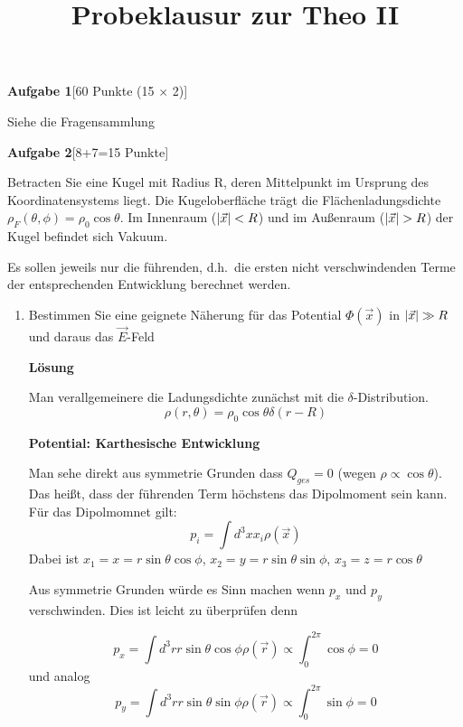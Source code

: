 
\title{Probeklausur zur Theo II}

\textbf{Aufgabe 1}\hfill[60 Punkte (15 $\times$ 2)]

Siehe die Fragensammlung

\textbf{Aufgabe 2}\hfill[8+7=15 Punkte]

Betracten Sie eine Kugel mit Radius R, deren Mittelpunkt im Ursprung des
Koordinatensystems liegt. Die Kugeloberfläche trägt die Flächenladungsdichte
$\rho_F(\theta,\phi)=\rho_0 \cos\theta$. Im Innenraum ($\abs{\vec x}<R$)
und im Außenraum ($\abs{\vec{x}}>R$) der Kugel befindet sich Vakuum.

Es sollen jeweils nur die führenden, d.h.\ die ersten nicht verschwindenden
Terme der entsprechenden Entwicklung berechnet werden.
\begin{enumerate}[label=\alph*)]
  \item Bestimmen Sie eine geignete Näherung für das Potential 
    $\Phi(\vec x)$ in $\abs{\vec x}\gg R$ und daraus
    das $\vec E$-Feld

    \textbf{Lösung} 

    Man verallgemeinere die Ladungsdichte zunächst mit die 
    $\delta$-Distribution.
    \begin{equation}
      \rho(r,\theta) = \rho_0 \cos\theta \delta(r-R)
    \end{equation}

    \textbf{Potential: Karthesische Entwicklung} 

    Man sehe direkt aus symmetrie Grunden dass $Q_{ges}=0$ 
    (wegen $\rho\propto\cos\theta$).
    Das heißt, dass der führenden Term höchstens das Dipolmoment sein kann.
    Für das Dipolmomnet gilt:
    \begin{equation}
      p_i = \int d^3x x_i \rho(\vec x)
    \end{equation}
    Dabei ist $x_1=x=r\sin\theta\cos\phi$, $x_2=y=r\sin\theta\sin\phi$,
    $x_3=z=r\cos\theta$

    Aus symmetrie Grunden würde es Sinn machen wenn $p_x$ und $p_y$
    verschwinden. Dies ist leicht zu überprüfen denn

    \begin{equation*}
      p_x=\int d^3r r\sin\theta\cos\phi \rho (\vec r)
      \propto \int_{0}^{2\pi}\cos\phi = 0
    \end{equation*}
    und analog
    \begin{equation*}
      p_y=\int d^3r r\sin\theta\sin\phi \rho(\vec r) 
      \propto \int_{0}^{2\pi}\sin\phi = 0
    \end{equation*}


\end{enumerate}
